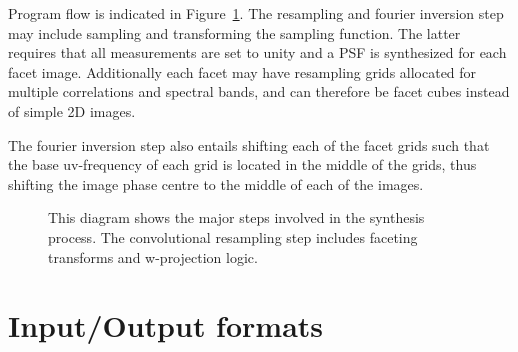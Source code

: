 Program flow is indicated in Figure~\ref{fig_workflow}. The resampling and fourier inversion step may include sampling and transforming the sampling function.
The latter requires that all measurements are set to unity and a PSF is synthesized for each facet image. Additionally 
each facet may have resampling grids allocated for multiple correlations and spectral bands, and can therefore be facet cubes 
instead of simple 2D images. 

The fourier inversion step also entails shifting each of the facet grids such that the base uv-frequency of each grid
is located in the middle of the grids, thus shifting the image phase centre to the middle of each of the images.
\begin{figure}[ht!]
 \begin{mdframed}
 \centering
 \caption[Imaging workflow]{This diagram shows the major steps involved in the synthesis process. The convolutional resampling step includes
 faceting transforms and w-projection logic.}
 \label{fig_workflow}
 \end{mdframed}
\end{figure}
\section{Input/Output formats}
